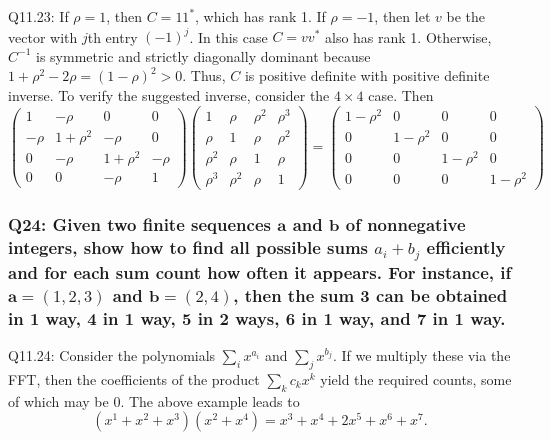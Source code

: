 \documentclass[8pt]{article}
\begin{document}
Q11.23: If \(\rho = 1\), then \(C = 11^*\), which has rank 1. If \(\rho = -1\), then let \(v\) be the vector with \(j\)th entry \((-1)^j\). In this case \(C = vv^*\) also has rank 1. Otherwise, \(C^{-1}\) is symmetric and strictly diagonally dominant because \(1 + \rho^2 - 2\rho = (1 - \rho)^2 > 0\). Thus, \(C\) is positive definite with positive definite inverse. To verify the suggested inverse, consider the \(4 \times 4\) case. Then
\[
\begin{pmatrix}
1 & -\rho & 0 & 0 \\
-\rho & 1 + \rho^2 & -\rho & 0 \\
0 & -\rho & 1 + \rho^2 & -\rho \\
0 & 0 & -\rho & 1
\end{pmatrix}
\begin{pmatrix}
1 & \rho & \rho^2 & \rho^3 \\
\rho & 1 & \rho & \rho^2 \\
\rho^2 & \rho & 1 & \rho \\
\rho^3 & \rho^2 & \rho & 1
\end{pmatrix}
= 
\begin{pmatrix}
1 - \rho^2 & 0 & 0 & 0 \\
0 & 1 - \rho^2 & 0 & 0 \\
0 & 0 & 1 - \rho^2 & 0 \\
0 & 0 & 0 & 1 - \rho^2
\end{pmatrix}
\]

\subsubsection*{Q24: Given two finite sequences \(\mathbf{a}\) and \(\mathbf{b}\) of nonnegative integers, show how to find all possible sums \(a_i + b_j\) efficiently and for each sum count how often it appears. For instance, if \(\mathbf{a} = (1, 2, 3)\) and \(\mathbf{b} = (2, 4)\), then the sum 3 can be obtained in 1 way, 4 in 1 way, 5 in 2 ways, 6 in 1 way, and 7 in 1 way.}

Q11.24: Consider the polynomials \(\sum_i x^{a_i}\) and \(\sum_j x^{b_j}\). If we multiply these via the FFT, then the coefficients of the product \(\sum_k c_k x^k\) yield the required counts, some of which may be 0. The above example leads to
\[
(x^1 + x^2 + x^3)(x^2 + x^4) = x^3 + x^4 + 2x^5 + x^6 + x^7.
\]
\end{document}
